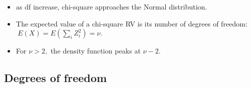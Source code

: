 \documentclass[11pt]{article}
\begin{document}
\begin{itemize}
\begin{itemize}
\begin{itemize}
\item as df increase, chi-square approaches the Normal distribution.

\item The expected value of a chi-square RV is its number of degrees of
freedom: $\ E(X)=E\left( \sum\nolimits_{i}Z_{i}^{2}\right) =\nu .$

\item For $\nu >2,$ the density function peaks at $\nu -2.$
\end{itemize}
\end{itemize}
\end{itemize}

\subsection{Degrees of freedom}
\end{document}
